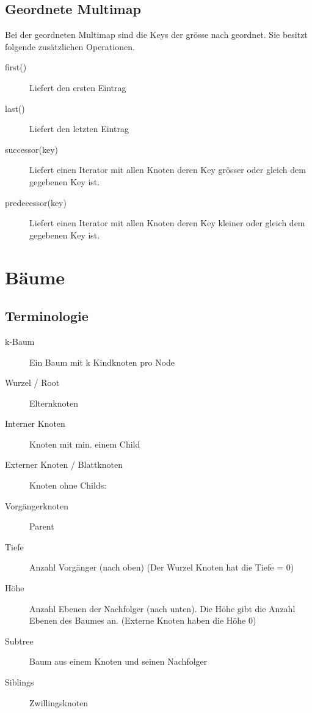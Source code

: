 \subsection{Geordnete Multimap}
Bei der geordneten Multimap sind die Keys der grösse nach geordnet. Sie besitzt folgende zusätzlichen Operationen.
\begin{description}
	\item[first()] Liefert den ersten Eintrag
	\item[last()] Liefert den letzten Eintrag
	\item[successor(key)] Liefert einen Iterator mit allen Knoten deren Key grösser oder gleich dem gegebenen Key ist.
	\item[predecessor(key)]  Liefert einen Iterator mit allen Knoten deren Key kleiner oder gleich dem gegebenen Key ist.
\end{description}

\section{Bäume}
\subsection{Terminologie}
\begin{description}
	\item[k-Baum] Ein Baum mit k Kindknoten pro Node
	\item[Wurzel / Root] Elternknoten
	\item[Interner Knoten] Knoten mit min. einem Child
	\item[Externer Knoten / Blattknoten] Knoten ohne Childs:
	\item[Vorgängerknoten] Parent
	\item[Tiefe] Anzahl Vorgänger (nach oben) (Der Wurzel Knoten hat die Tiefe = 0)
	\item[Höhe] Anzahl Ebenen der Nachfolger (nach unten). Die Höhe gibt die Anzahl Ebenen des Baumes an. (Externe Knoten haben die Höhe 0)
	\item[Subtree] Baum aus einem Knoten und seinen Nachfolger
	\item[Siblings] Zwillingsknoten
\end{description}

